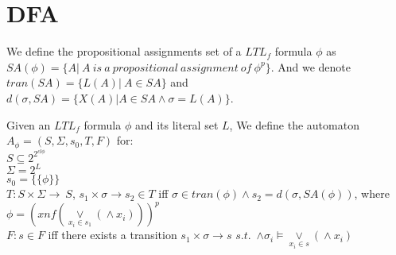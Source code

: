 \section{DFA}
We define the propositional assignments set of a $LTL_f$ formula $\phi$ as $SA(\phi)=\{A|\ A\ is\ a\ propositional\ assignment\ of\ \phi^p\}$. And we denote $tran(SA)=\{L(A)|\ A\in SA\}$ and $d(\sigma,SA)=\{X(A)|A\in SA\land\sigma=L(A)\}$.

Given an $LTL_f$ formula $\phi$ and its literal set $L$, We define the automaton $A_{\phi}=(S,\Sigma,s_0,T,F)$ for:\\
$S\subseteq2^{2^{cl\phi} }$\\
$\Sigma=2^L$\\
$s_0=\{\{\phi\}\}$\\
$T: S\times\Sigma\to~S$, $s_1\times\sigma\to s_2\in T$ iff $\sigma \in tran(\phi)\land s_2=d(\sigma,SA(\phi))$, where $\phi=(xnf(\mathop{\lor}\limits_{x_i\in s_1}(\mathop{\land} x_i)))^p$\\
$F: s\in F$ iff there exists a transition $s_1\times\sigma\to s$ $s.t.$~$\land\sigma_i\models \mathop{\lor}\limits_{x_i\in s}(\mathop{\land} x_i)$

